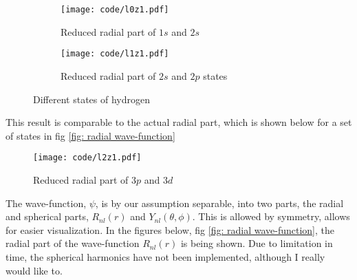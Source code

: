 \documentclass[a4paper]{article}
\begin{document}
\begin{figure}[H]
    \centering
    \begin{subfigure}{0.45\textwidth}
        \texttt{[image: code/l0z1.pdf]}
        \caption{Reduced radial part of $1s$ and $2s$}
        \label{fig: l = 0}
    \end{subfigure}
    \hfill
    \begin{subfigure}{0.45\textwidth}
        \texttt{[image: code/l1z1.pdf]}
        \caption{Reduced radial part of $2s$ and $2p$ states}
        \label{fig: l = 1}
    \end{subfigure}
    \caption{Different states of hydrogen}
    \label{fig: different l}
\end{figure}\noindent
This result is comparable to the actual radial part, which is shown below for a set of states in fig \ref{fig: radial wave-function}
\begin{figure}[H]
    \centering
    \texttt{[image: code/l2z1.pdf]}
    \caption{Reduced radial part of $3p$ and $3d$}
    \label{fig: l = 2}
\end{figure}\noindent
The wave-function, $\psi$, is by our assumption separable, into two parts, the radial and spherical parts, $R_{nl}(r)$ and $Y_{nl}(\theta, \phi)$.
This is allowed by symmetry, allows for easier visualization.
In the figures below, fig \ref{fig: radial wave-function}, the radial part of the wave-function $R_{nl}(r)$ is being shown.
Due to limitation in time, the spherical harmonics have not been implemented, although I really would like to.
\end{document}
